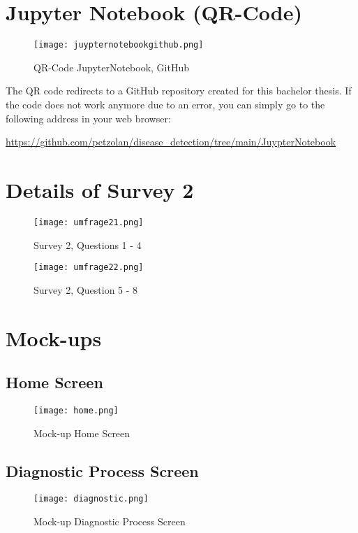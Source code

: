 \pagebreak
\tocless\chapter{Jupyter Notebook (QR-Code)}
\begin{figure}[H]
	\centering
	\texttt{[image: juypternotebookgithub.png]}
	\caption{QR-Code JupyterNotebook, GitHub}
\end{figure}
The QR code redirects to a GitHub repository created for this bachelor thesis. If the code does not work anymore due to an error, you can simply go to the following address in your web browser:
\begin{center}
	\url{https://github.com/petzolan/disease_detection/tree/main/JuypterNotebook}
\end{center}



\tocless\chapter{Details of Survey 2}
\begin{center}
	\begin{figure}[H]
		\centering
		\texttt{[image: umfrage21.png]}
		\caption{Survey 2, Questions 1 - 4}
	\end{figure}
	\begin{figure}[H]
		\centering
		\texttt{[image: umfrage22.png]}
		\caption{Survey 2, Question 5 - 8}
	\end{figure}
\end{center}
\pagebreak


\tocless\chapter{Mock-ups}
\tocless\section{Home Screen}
\begin{figure}[H]
	\centering
	\texttt{[image: home.png]}
	\caption{Mock-up Home Screen}
\end{figure}

\tocless\section{Diagnostic Process Screen}
\begin{figure}[H]
	\centering
	\texttt{[image: diagnostic.png]}
	\caption{Mock-up Diagnostic Process Screen}
\end{figure}

